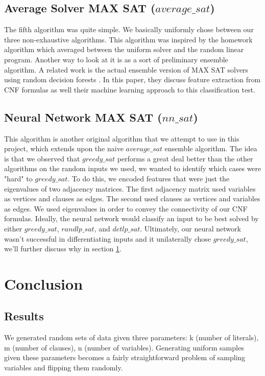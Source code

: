 \documentclass[paper=a4, fontsize=11pt]{scrartcl} %
\numberwithin{equation}{section} %
\numberwithin{figure}{section} %
\numberwithin{table}{section} %
\begin{document}
\subsection{Average Solver MAX SAT ($average\_sat$)}

The fifth algorithm was quite simple.  We basically uniformly chose between our three non-exhaustive algorithms.  This algorithm was inspired by the homework algorithm which averaged between the uniform solver and the random linear program.  Another way to look at it is as a sort of preliminary ensemble algorithm.  A related work is the actual ensemble version of MAX SAT solvers using random decision forests \cite{POS-14:New_CNF_Features_and_Formula_Classification}.  In this paper, they discuss feature extraction from CNF formulas as well their machine learning approach to this classification test.

\subsection{Neural Network MAX SAT ($nn\_sat$)}

This algorithm is another original algorithm that we attempt to use in this project, which extends upon the naive $average\_sat$ ensemble algorithm.   The idea is that we observed that $greedy\_sat$ performs a great deal better than the other algorithms on the random inputs we used, we wanted to identify which cases were "hard" to $greedy\_sat$.  To do this, we encoded features that were just the eigenvalues of two adjacency matrices.  The first adjacency matrix used variables as vertices and clauses as edges.  The second used clauses as vertices and variables as edges.  We used eigenvalues in order to convey the connectivity of our CNF formulas.  Ideally, the neural network would classify an input to be best solved by either $greedy\_sat$, $randlp\_sat$, and $detlp\_sat$.  Ultimately, our neural network wasn't successful in differentiating inputs and it unilaterally chose $greedy\_sat$, we'll further discuss why in section \ref{Conclusion}.


\section{Conclusion}
\label{Conclusion}

\subsection{Results}
\label{Results}
 We generated random sets of data given three parameters: k (number of literals), m (number of clauses), n (number of variables).  Generating uniform samples given these parameters becomes a fairly straightforward problem of sampling variables and flipping them randomly.\\
\end{document}
